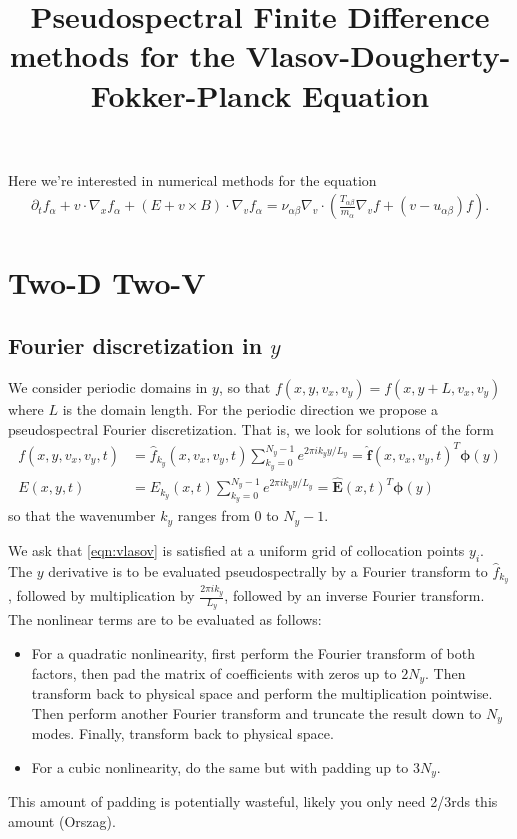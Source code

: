 \documentclass{article}
\title{Pseudospectral Finite Difference methods for the Vlasov-Dougherty-Fokker-Planck Equation}
\newcommand{\Tab}{T_{\alpha\beta}}
\newcommand{\uab}{u_{\alpha\beta}}
\newcommand{\nuab}{\nu_{\alpha\beta}}
\newcommand{\fa}{f_{\alpha}}
\newcommand{\Dx}{\nabla_x}
\newcommand{\Dv}{\nabla_v}
\begin{document}
\maketitle

Here we're interested in numerical methods for the equation
\begin{align}
    \label{eqn:vlasov}
\partial_t \fa + v \cdot \Dx \fa + (E + v \times B) \cdot \Dv \fa = \nuab \Dv \cdot \left( \frac{\Tab}{m_\alpha} \Dv f + (v - \uab) f \right).
\end{align}

\section{Two-D Two-V}

\subsection{Fourier discretization in $y$}

We consider periodic domains in $y$, so that $f(x, y, v_x, v_y) = f(x, y+L, v_x, v_y)$ where $L$ is the domain length.
For the periodic direction we propose a pseudospectral Fourier discretization.
That is, we look for solutions of the form
\begin{align*}
    f(x, y, v_x, v_y, t) &= \hat{f}_{k_y}(x, v_x, v_y, t) \sum_{k_y = 0}^{N_y-1} e^{2 \pi ik_y y/L_y} = \hat{\bm{f}}(x, v_x, v_y, t)^T \bm{\phi}(y) \\
    E(x, y, t) &= \hat{E}_{k_y}(x, t) \sum_{k_y = 0}^{N_y-1} e^{2 \pi ik_y y/L_y} = \hat{\bm{E}}(x, t)^T \bm{\phi}(y)
\end{align*}
so that the wavenumber $k_y$ ranges from $0$ to $N_y-1$.

We ask that \eqref{eqn:vlasov} is satisfied at a uniform grid of collocation points $y_i$.
The $y$ derivative is to be evaluated pseudospectrally by a Fourier transform to $\hat{f}_{k_y}$,
followed by multiplication by $\frac{2\pi i k_y}{L_y}$, followed by an inverse Fourier transform.
The nonlinear terms are to be evaluated as follows:
\begin{itemize}
    \item For a quadratic nonlinearity, first perform the Fourier transform of both factors, then pad the
        matrix of coefficients with zeros up to $2N_y$.
        Then transform back to physical space and perform the multiplication pointwise.
        Then perform another Fourier transform and truncate the result down to $N_y$ modes.
        Finally, transform back to physical space.
    \item For a cubic nonlinearity, do the same but with padding up to $3N_y$.
\end{itemize}
This amount of padding is potentially wasteful, likely you only need 2/3rds this amount (Orszag).
\end{document}
